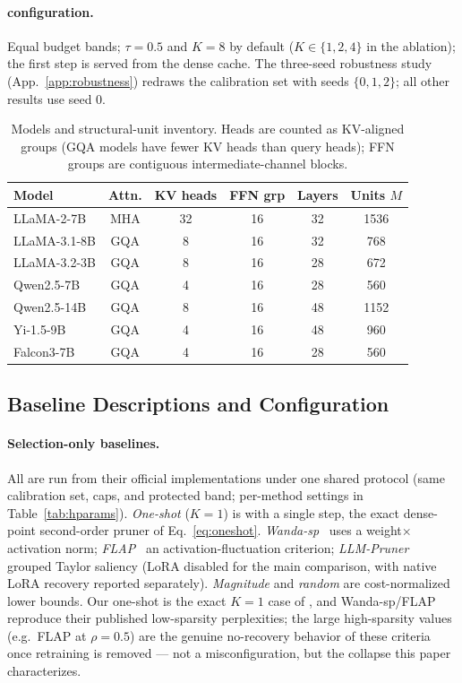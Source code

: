 \paragraph{\method{} configuration.} Equal budget bands; $\tau{=}0.5$ and $K{=}8$ by default
($K\in\{1,2,4\}$ in the ablation); the first step is served from the dense cache. The three-seed
robustness study (App.~\ref{app:robustness}) redraws the calibration set with seeds $\{0,1,2\}$; all
other results use seed $0$.

\begin{table}[t]\centering\footnotesize
\caption{Models and structural-unit inventory. Heads are counted as KV-aligned groups (GQA models
have fewer KV heads than query heads); FFN groups are contiguous intermediate-channel blocks.}
\label{tab:models}
\setlength{\tabcolsep}{4pt}
\begin{tabular}{l c c c c c}
\toprule
Model & Attn. & KV heads & FFN grp & Layers & Units $M$ \\
\midrule
LLaMA-2-7B   & MHA & 32 & 16 & 32 & 1536 \\
LLaMA-3.1-8B & GQA & 8  & 16 & 32 & 768 \\
LLaMA-3.2-3B & GQA & 8  & 16 & 28 & 672 \\
Qwen2.5-7B   & GQA & 4  & 16 & 28 & 560 \\
Qwen2.5-14B  & GQA & 8  & 16 & 48 & 1152 \\
Yi-1.5-9B    & GQA & 4  & 16 & 48 & 960 \\
Falcon3-7B   & GQA & 4  & 16 & 28 & 560 \\
\bottomrule
\end{tabular}
\end{table}

\subsection{Baseline Descriptions and Configuration}
\label{app:baselines}
\paragraph{Selection-only baselines.}
All are run from their official implementations under one shared protocol (same calibration set, caps, and protected band; per-method settings in Table~\ref{tab:hparams}).
\emph{One-shot} ($K{=}1$) is \method with a single step, the exact dense-point second-order pruner of Eq.~\eqref{eq:oneshot}.
\emph{Wanda-sp}~\citep{sun2024wanda} uses a weight$\times$activation norm; \emph{FLAP}~\citep{an2024flap} an activation-fluctuation criterion; \emph{LLM-Pruner}~\citep{ma2023llmpruner} grouped Taylor saliency (LoRA disabled for the main comparison, with native LoRA recovery reported separately).
\emph{Magnitude} and \emph{random} are cost-normalized lower bounds.
Our one-shot is the exact $K{=}1$ case of \method, and Wanda-sp/FLAP reproduce their published low-sparsity perplexities; the large high-sparsity values (e.g.\ FLAP at $\rho{=}0.5$) are the genuine no-recovery behavior of these criteria once retraining is removed --- not a misconfiguration, but the collapse this paper characterizes.

